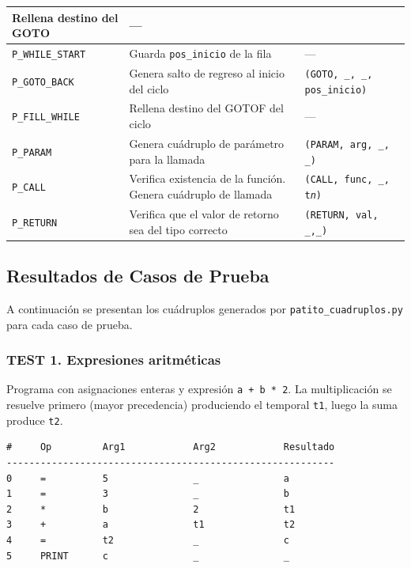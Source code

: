 \documentclass[12pt, letterpaper]{article}
\theoremstyle{definition}
\begin{document}
\begin{longtable}{|p{4.2cm}|p{5cm}|p{5.5cm}|}
    Rellena destino del GOTO &
    --- \\ \hline
    \texttt{P\_WHILE\_START} &
    Guarda \texttt{pos\_inicio} de la fila &
    --- \\ \hline
    \texttt{P\_GOTO\_BACK} &
    Genera salto de regreso al inicio del ciclo &
    \texttt{(GOTO, \_, \_, pos\_inicio)} \\ \hline
    \texttt{P\_FILL\_WHILE} &
    Rellena destino del GOTOF del ciclo &
    --- \\ \hline
    \texttt{P\_PARAM} &
    Genera cuádruplo de parámetro para la llamada &
    \texttt{(PARAM, arg, \_, \_)} \\ \hline
    \texttt{P\_CALL} &
    Verifica existencia de la función. Genera cuádruplo de llamada &
    \texttt{(CALL, func, \_, t\textit{n})} \\ \hline
    \texttt{P\_RETURN} &
    Verifica que el valor de retorno sea del tipo correcto &
    \texttt{(RETURN, val, \_,\_)} \\ \hline
    
\end{longtable}

\subsection{Resultados de Casos de Prueba}

A continuación se presentan los cuádruplos generados por \texttt{patito\_cuadruplos.py} para cada caso de prueba.


\subsubsection*{TEST 1. Expresiones aritméticas}

Programa con asignaciones enteras y expresión \texttt{a + b * 2}.  La multiplicación se resuelve primero (mayor precedencia) produciendo el temporal \texttt{t1}, luego la suma produce \texttt{t2}.

\begin{verbatim}
#     Op         Arg1            Arg2            Resultado
----------------------------------------------------------
0     =          5               _               a
1     =          3               _               b
2     *          b               2               t1
3     +          a               t1              t2
4     =          t2              _               c
5     PRINT      c               _               _
\end{verbatim}
\end{document}
